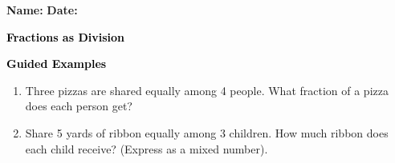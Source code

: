 \documentclass[12pt, letterpaper, fleqn]{article}
\begin{document}
\textbf{Name:} \underline{\hspace{5cm}}
\hfill
\textbf{Date:} \underline{\hspace{3cm}}\\

\begin{tcolorbox}[colback=customteal!20]
    \large\textcolor{black}{\textbf{Fractions as Division}}
\end{tcolorbox}
\newpage
\begin{tcolorbox}[colback=customteal!20]
    \large\textcolor{black}{\textbf{Guided Examples}}
\end{tcolorbox}
\begin{enumerate}[itemsep=3.5cm, leftmargin=0.6cm]
\item Three pizzas are shared equally among 4 people. What fraction of a pizza does each person get?
\vspace{3cm}
\item Share 5 yards of ribbon equally among 3 children. How much ribbon does each child receive? (Express as a mixed number).
\end{enumerate}
\end{document}
